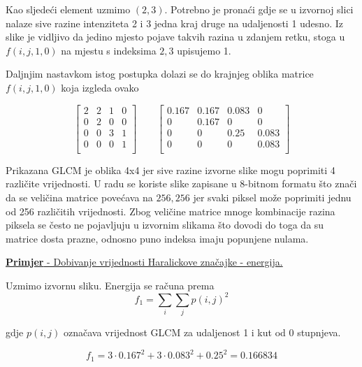 \documentclass[times, utf8, zavrsni]{fer}
\begin{document}
\bigbreak

Kao sljedeći element uzmimo \((2,3)\).
Potrebno je pronaći gdje se u izvornoj slici nalaze sive razine intenziteta
2 i 3 jedna kraj druge na udaljenosti 1 udesno. Iz slike je vidljivo da 
jedino mjesto pojave takvih razina u zdanjem retku, stoga u \(f(i,j,1,0)\)
na mjestu s indeksima \(2,3\) upisujemo 1. 


\newpage

Daljnjim nastavkom istog postupka
dolazi se do krajnjeg oblika matrice \(f(i,j,1,0)\) koja izgleda ovako

\begin{minipage}{\linewidth}
\centering
\[
\begin{bmatrix}
2&2&1&0\\
0&2&0&0\\
0&0&3&1\\
0&0&0&1\\
\end{bmatrix}
\quad
\quad
\begin{bmatrix}
0.167&0.167&0.083&0\\
0&0.167&0&0\\
0&0&0.25&0.083\\
0&0&0&0.083\\
\end{bmatrix}
\]
\end{minipage}

\bigbreak

Prikazana GLCM je oblika 4x4 jer sive razine izvorne slike mogu poprimiti
4 različite vrijednosti. U radu se koriste slike zapisane u 8-bitnom formatu
što znači da se veličina matrice povećava na \(256,256\) jer svaki piksel može
poprimiti jednu od 256 različitih vrijednosti. Zbog veličine matrice mnoge
kombinacije razina piksela se često ne pojavljuju u izvornim slikama što
dovodi do toga da su matrice dosta prazne, odnosno puno indeksa imaju popunjene 
nulama.

\bigbreak

\underline{\textbf{Primjer} - Dobivanje vrijednosti Haralickove značajke - energija.}

\bigbreak

Uzmimo izvornu sliku. Energija se računa prema
\[
f_1 = \sum_{i}\sum_{j}p(i,j)^2
\]

gdje \(p(i,j)\) označava vrijednost GLCM za udaljenost 1 i kut od 0 stupnjeva.

\[
f_1 = 3 \cdot 0.167^2 + 3 \cdot 0.083^2 + 0.25^2 = 0.166834
\]
\end{document}
